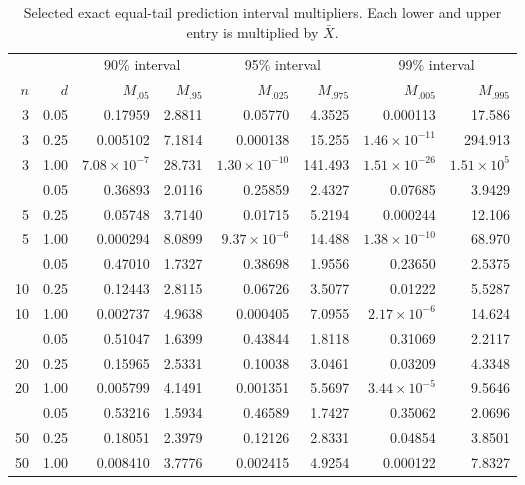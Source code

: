 \documentclass[11pt]{article}
\theoremstyle{remark}
\begin{document}
\begin{table}[htbp]
\centering
\caption{Selected exact equal-tail prediction interval multipliers. Each lower and upper entry is multiplied by $\bar X$.}
\label{tab:interval_multipliers}
\scriptsize
\setlength{\tabcolsep}{4.2pt}
\begin{tabular}{@{}rr rr rr rr@{}}
\toprule
&& \multicolumn{2}{c}{90\% interval} & \multicolumn{2}{c}{95\% interval} & \multicolumn{2}{c}{99\% interval}\\
\cmidrule(lr){3-4}\cmidrule(lr){5-6}\cmidrule(lr){7-8}
$n$ & $d$ & $M_{.05}$ & $M_{.95}$ & $M_{.025}$ & $M_{.975}$ & $M_{.005}$ & $M_{.995}$\\
\midrule
3 & 0.05 & 0.17959 & 2.8811 & 0.05770 & 4.3525 & 0.000113 & 17.586\\
3 & 0.25 & 0.005102 & 7.1814 & 0.000138 & 15.255 & $1.46\times10^{-11}$ & 294.913\\
3 & 1.00 & $7.08\times10^{-7}$ & 28.731 & $1.30\times10^{-10}$ & 141.493 & $1.51\times10^{-26}$ & $1.51\times10^{5}$\\
\addlinespace
5 & 0.05 & 0.36893 & 2.0116 & 0.25859 & 2.4327 & 0.07685 & 3.9429\\
5 & 0.25 & 0.05748 & 3.7140 & 0.01715 & 5.2194 & 0.000244 & 12.106\\
5 & 1.00 & 0.000294 & 8.0899 & $9.37\times10^{-6}$ & 14.488 & $1.38\times10^{-10}$ & 68.970\\
\addlinespace
10 & 0.05 & 0.47010 & 1.7327 & 0.38698 & 1.9556 & 0.23650 & 2.5375\\
10 & 0.25 & 0.12443 & 2.8115 & 0.06726 & 3.5077 & 0.01222 & 5.5287\\
10 & 1.00 & 0.002737 & 4.9638 & 0.000405 & 7.0955 & $2.17\times10^{-6}$ & 14.624\\
\addlinespace
20 & 0.05 & 0.51047 & 1.6399 & 0.43844 & 1.8118 & 0.31069 & 2.2117\\
20 & 0.25 & 0.15965 & 2.5331 & 0.10038 & 3.0461 & 0.03209 & 4.3348\\
20 & 1.00 & 0.005799 & 4.1491 & 0.001351 & 5.5697 & $3.44\times10^{-5}$ & 9.5646\\
\addlinespace
50 & 0.05 & 0.53216 & 1.5934 & 0.46589 & 1.7427 & 0.35062 & 2.0696\\
50 & 0.25 & 0.18051 & 2.3979 & 0.12126 & 2.8331 & 0.04854 & 3.8501\\
50 & 1.00 & 0.008410 & 3.7776 & 0.002415 & 4.9254 & 0.000122 & 7.8327\\
\bottomrule
\end{tabular}
\end{table}
\FloatBarrier
\end{document}
